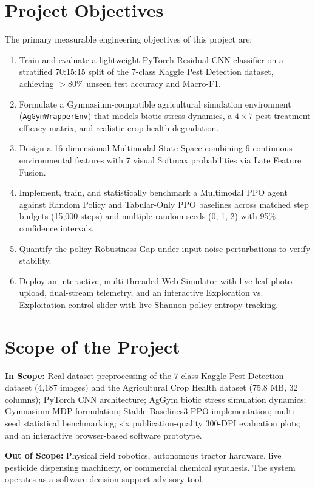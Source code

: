 \documentclass[12pt,a4paper]{report}
\begin{document}
\section{Project Objectives}
The primary measurable engineering objectives of this project are:
\begin{enumerate}
    \item Train and evaluate a lightweight PyTorch Residual CNN classifier on a stratified 70:15:15 split of the 7-class Kaggle Pest Detection dataset, achieving $> 80\%$ unseen test accuracy and Macro-F1.
    \item Formulate a Gymnasium-compatible agricultural simulation environment (\texttt{AgGymWrapperEnv}) that models biotic stress dynamics, a $4 \times 7$ pest-treatment efficacy matrix, and realistic crop health degradation.
    \item Design a 16-dimensional Multimodal State Space combining 9 continuous environmental features with 7 visual Softmax probabilities via Late Feature Fusion.
    \item Implement, train, and statistically benchmark a Multimodal PPO agent against Random Policy and Tabular-Only PPO baselines across matched step budgets (15,000 steps) and multiple random seeds (0, 1, 2) with 95\% confidence intervals.
    \item Quantify the policy Robustness Gap under input noise perturbations to verify stability.
    \item Deploy an interactive, multi-threaded Web Simulator with live leaf photo upload, dual-stream telemetry, and an interactive Exploration vs. Exploitation control slider with live Shannon policy entropy tracking.
\end{enumerate}

\section{Scope of the Project}
\textbf{In Scope:} Real dataset preprocessing of the 7-class Kaggle Pest Detection dataset (4,187 images) and the Agricultural Crop Health dataset (75.8 MB, 32 columns); PyTorch CNN architecture; AgGym biotic stress simulation dynamics; Gymnasium MDP formulation; Stable-Baselines3 PPO implementation; multi-seed statistical benchmarking; six publication-quality 300-DPI evaluation plots; and an interactive browser-based software prototype.

\textbf{Out of Scope:} Physical field robotics, autonomous tractor hardware, live pesticide dispensing machinery, or commercial chemical synthesis. The system operates as a software decision-support advisory tool.
\end{document}

